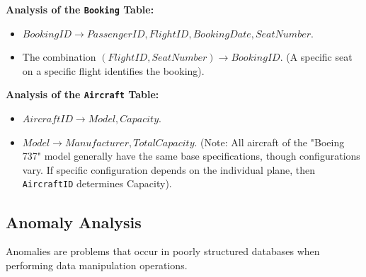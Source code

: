 \documentclass[12pt, a4paper]{article}
\begin{document}
	\textbf{Analysis of the \texttt{Booking} Table:}
	\begin{itemize}
		\item $BookingID \rightarrow PassengerID, FlightID, BookingDate, SeatNumber$.
		\item The combination $(FlightID, SeatNumber) \rightarrow BookingID$. (A specific seat on a specific flight identifies the booking).
	\end{itemize}
	
	\textbf{Analysis of the \texttt{Aircraft} Table:}
	\begin{itemize}
		\item $AircraftID \rightarrow Model, Capacity$.
		\item $Model \rightarrow Manufacturer, TotalCapacity$. (Note: All aircraft of the "Boeing 737" model generally have the same base specifications, though configurations vary. If specific configuration depends on the individual plane, then \texttt{AircraftID} determines Capacity).
	\end{itemize}
	
	\subsection{Anomaly Analysis}
	
	Anomalies are problems that occur in poorly structured databases when performing data manipulation operations.
	
\end{document}
